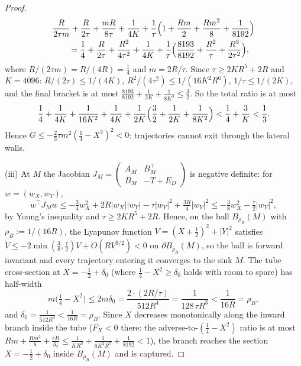 \begin{proof}
\begin{equation}
\begin{aligned}
&\frac R{2\tau m}+\frac R{2\tau}+\frac{mR}{8\tau}+\frac1{4K}+\frac1\tau\Bigl(1+\frac{Rm}2+\frac{Rm^2}8+\frac1{8192}\Bigr)\\
&\qquad=\frac14+\frac R{2\tau}+\frac{R^2}{4\tau^2}+\frac1{4K}+\frac1\tau\Bigl(\frac{8193}{8192}+\frac{R^2}\tau+\frac{R^3}{2\tau^2}\Bigr),
\end{aligned}
\end{equation}
where $R/(2\tau m)=R/(4R)=\frac14$ and $m=2R/\tau$. Since $\tau\ge2KR^5+2R$ and $K=4096$: $R/(2\tau)\le1/(4K)$, $R^2/(4\tau^2)\le1/(16K^2R^6)$, $1/\tau\le1/(2K)$, and the final bracket is at most $\frac{8193}{8192}+\frac1{2K}+\frac1{8K^2}\le\frac32$. So the total ratio is at most
\[
\frac14+\frac1{4K}+\frac1{16K^2}+\frac1{4K}+\frac1{2K}\Bigl(\frac32+\frac1{2K}+\frac1{8K^2}\Bigr)<\frac14+\frac3K<\frac13 .
\]
Hence $\dot G\le-\frac23\tau m^2(\frac14-X^2)^2<0$: trajectories cannot exit through the lateral walls.

(iii) At $M$ the Jacobian $J_M=\begin{pmatrix}A_M&B_M^{\top}\\B_M&-T+E_D\end{pmatrix}$ is negative definite: for $w=(w_X,w_Y)$,
\[
w^{\top}J_Mw\le-\tfrac34w_X^2+2R|w_X||w_Y|-\tau|w_Y|^2+\tfrac{3R}4|w_Y|^2\le-\tfrac38w_X^2-\tfrac\tau2|w_Y|^2,
\]
by Young's inequality and $\tau\ge2KR^5+2R$. Hence, on the ball $B_{\rho_B}(M)$ with $\rho_B:=1/(16R)$, the Lyapunov function $V=(X+\frac12)^2+|Y|^2$ satisfies $\dot V\le-2\min(\frac38,\frac\tau2)V+O(RV^{3/2})<0$ on $\partial B_{\rho_B}(M)$, so the ball is forward invariant and every trajectory entering it converges to the sink $M$. The tube cross-section at $X=-\frac12+\delta_0$ (where $\frac14-X^2\ge\delta_0$ holds with room to spare) has half-width
\[
m\bigl(\tfrac14-X^2\bigr)\le2m\delta_0=\frac{2\cdot(2R/\tau)}{512R^4}=\frac1{128\,\tau R^3}<\frac1{16R}=\rho_B,
\]
and $\delta_0=\frac1{512R^4}<\frac1{16R}=\rho_B$. Since $X$ decreases monotonically along the inward branch inside the tube ($F_X<0$ there: the adverse-to-$(\frac14-X^2)$ ratio is at most $Rm+\frac{Rm^2}8+\frac{rR}{\delta_0}\le\frac1{KR^3}+\frac1{8K^2R^7}+\frac1{8192}<1$), the branch reaches the section $X=-\frac12+\delta_0$ inside $B_{\rho_B}(M)$ and is captured.
\end{proof}


